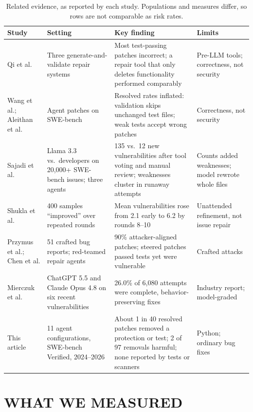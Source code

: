 \documentclass[10pt,journal,compsoc]{IEEEtran}
\newcommand{\mgsection}[1]{\section*{\MakeUppercase{#1}}}
\begin{document}
\begin{table}[t]
\centering
\caption{Related evidence, as reported by each study. Populations and measures
differ, so rows are not comparable as risk rates.}
\label{tab:evidence}
\footnotesize
\renewcommand{\arraystretch}{1.16}
\begin{tabular}{@{}p{2.5cm}p{4.3cm}p{5.4cm}p{4.4cm}@{}}
\toprule
\textbf{Study} & \textbf{Setting} & \textbf{Key finding} & \textbf{Limits}\\
\midrule
Qi et al.\cite{qi2015plausibility} & Three generate-and-validate repair systems
 & Most test-passing patches incorrect; a repair tool that only deletes functionality performed comparably
 & Pre-LLM tools; correctness, not security \\
Wang et al.;\cite{wang2026solved} Aleithan et al.\cite{aleithan2024swebenchplus} & Agent patches on SWE-bench
 & Resolved rates inflated: validation skips unchanged test files; weak tests accept wrong patches
 & Correctness, not security \\
Sajadi et al.\cite{sajadi2025howsafe} & Llama 3.3 vs.\ developers on 20,000+ SWE-bench issues; three agents
 & 135 vs.\ 12 new vulnerabilities after tool voting and manual review; weaknesses cluster in runaway attempts
 & Counts added weaknesses; model rewrote whole files \\
Shukla et al.\cite{shukla2025degradation} & 400 samples ``improved'' over repeated rounds
 & Mean vulnerabilities rose from 2.1 early to 6.2 by rounds 8--10
 & Unattended refinement, not issue repair \\
Przymus et al.;\cite{przymus2026adversarial} Chen et al.\cite{chen2026redteaming} & 51 crafted bug reports; red-teamed repair agents
 & 90\% attacker-aligned patches; steered patches passed tests yet were vulnerable
 & Crafted attacks \\
Mierczuk et al.\cite{hoodlet2026flawed} & ChatGPT 5.5 and Claude Opus 4.8 on six recent vulnerabilities
 & 26.0\% of 6,080 attempts were complete, behavior-preserving fixes
 & Industry report; model-graded \\
This article & 11 agent configurations, SWE-bench Verified, 2024--2026
 & About 1 in 40 resolved patches removed a protection or test; 2 of 97 removals harmful; none reported by tests or scanners
 & Python; ordinary bug fixes \\
\bottomrule
\end{tabular}
\end{table}

\mgsection{What we measured}
\end{document}
